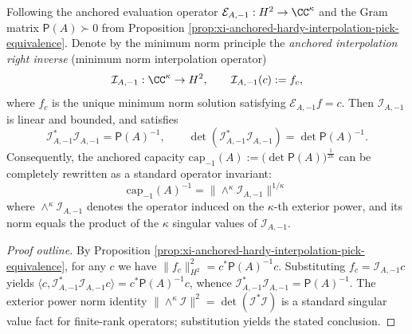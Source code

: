 \begin{proposition}\label{prop:xi-anchored-capacity-exterior-power-interpolant}
Following the anchored evaluation operator
\(\mathcal{E}_{A,-1}:H^2\to\CC^{\kappa}\) and the Gram matrix \(\mathsf P(A)\succ0\) from Proposition \ref{prop:xi-anchored-hardy-interpolation-pick-equivalence}.
Denote by the minimum norm principle the \emph{anchored interpolation right inverse} (minimum norm interpolation operator)
\[
\mathcal{I}_{A,-1}:\CC^{\kappa}\to H^2,\qquad \mathcal{I}_{A,-1}(c):=f_c,
\]
where \(f_c\) is the unique minimum norm solution satisfying \(\mathcal{E}_{A,-1}f=c\).
Then \(\mathcal{I}_{A,-1}\) is linear and bounded, and satisfies
\[
\boxed{\;
\mathcal{I}_{A,-1}^{\ast}\mathcal{I}_{A,-1}=\mathsf P(A)^{-1},
\qquad
\det(\mathcal{I}_{A,-1}^{\ast}\mathcal{I}_{A,-1})=\det\mathsf P(A)^{-1}.\;}
\]
Consequently, the anchored capacity
\(\mathrm{cap}_{-1}(A):=\bigl(\det\mathsf P(A)\bigr)^{\frac{1}{2\kappa}}\)
can be completely rewritten as a standard operator invariant:
\[
\boxed{\;
\mathrm{cap}_{-1}(A)^{-1}
=\bigl\|\wedge^{\kappa}\mathcal{I}_{A,-1}\bigr\|^{1/\kappa}\;}
\]
where \(\wedge^{\kappa}\mathcal{I}_{A,-1}\) denotes the operator induced on the \(\kappa\)-th exterior power, and its norm equals the product of the \(\kappa\) singular values of \(\mathcal{I}_{A,-1}\).
\end{proposition}
\begin{proof}[Proof outline]
By Proposition \ref{prop:xi-anchored-hardy-interpolation-pick-equivalence},
for any \(c\) we have \(\|f_c\|_{H^2}^2=c^\ast\mathsf P(A)^{-1}c\).
Substituting \(f_c=\mathcal{I}_{A,-1}c\) yields
\(\langle c,\mathcal{I}_{A,-1}^{\ast}\mathcal{I}_{A,-1}c\rangle
=c^\ast\mathsf P(A)^{-1}c\), whence \(\mathcal{I}_{A,-1}^{\ast}\mathcal{I}_{A,-1}=\mathsf P(A)^{-1}\).
The exterior power norm identity \(\|\wedge^{\kappa}\mathcal{I}\|^2=\det(\mathcal{I}^{\ast}\mathcal{I})\) is a standard singular value fact for finite-rank operators; substitution yields the stated conclusion. \qedhere
\end{proof}

